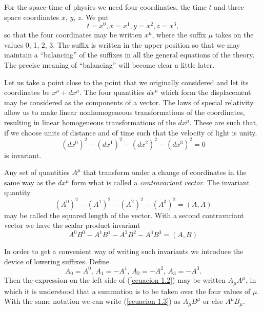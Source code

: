 For the space-time of physics we need four coordinates, the time $t$ and three 
space coordinates $x$, $y$, $z$. We put 
\[
 t = x^0, x = x^1, y = x^2, z = x^3,
\]
so that the four coordinates may be written $x^\mu$, where the suffix $\mu$ 
takes on the values 0, 1, 2, 3. The suffix is written in the upper position so 
that we may maintain a ``balancing'' of the suffixes in all the general 
equations of the theory. The precise meaning of ``balancing'' will become clear 
a little later.

Let us take a point close to the point that we originally considered and let 
its coordinates be $x^\mu + dx^\mu$. The four quantities $dx^\mu$ which form 
the displacement may be considered as the components of a vector. The laws of 
special relativity allow us to make linear nonhomogeneous transformations of the 
coordinates, resulting in linear homogeneous transformations of the $dx^\mu$. 
These are such that, if we choose units of distance and of time such that the 
velocity of light is unity,
\begin{equation}
\label{ecuacion 1.1}
 \left( dx^0 \right)^2 - \left( dx^1 \right)^2 - \left( dx^2 \right)^2 - \left( dx^3 \right)^2 = 0 
\end{equation}
is invariant.

Any set of quantities $A^\mu$ that transform under a change of coordinates in 
the same way as the $dx^\mu$ form what is called a \emph{contravariant vector}. 
The invariant quantity 
\begin{equation}
 \label{ecuacion 1.2}
 \left(A^0 \right)^2 -  \left(A^1 \right)^2 -  \left(A^2 \right)^2 - \left(A^3 \right)^2 = \left( A , A \right) 
\end{equation}
may be called the squared length of the vector. With a second contravariant 
vector we have the scalar product invariant
\begin{equation}
 \label{ecuacion 1.3}
 A^0 B^0  - A^1 B^1 - A^2 B^2 - A^3 B^3 = \left( A, B \right)
\end{equation}

In order to get a convenient way of writing such invariants we introduce the 
device of lowering suffixes. Define
\begin{equation}
 \label{ecuacion 1.4}
 A_0 = A^0,\, A_1 = -A^1,\, A_2 = -A^2,\, A_3 = -A^3 .
\end{equation}
Then the expression on the left side of (\ref{ecuacion 1.2}) may be written 
$A_\mu A^\mu$, in which it is understood that a summation is to be taken over 
the four values of $\mu$. With the same notation we can write (\ref{ecuacion 
1.3}) as $A_\mu B^\mu$ or else $A^\mu B_\mu$.

